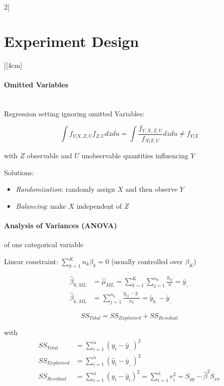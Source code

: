 \documentclass[8pt]{extarticle}
\begin{document}
\begin{multicols}{2}[\section{Experiment Design}][4cm]

\paragraph{Omitted Variables} \ \\

Regression setting ignoring omitted Variables:

$$\int f_{Y|X,Z,U}f_{Z,U}dzdu = \int \frac{f_{Y,X,Z,U}}{f_{X|Z,U}}dzdu \neq f_{Y|X}$$

\noindent with $Z$ observable and $U$ unobservable quantities influencing $Y$

Solutions:
\begin{itemize}
\item \textit{Randomization}: randomly assign $X$ and then observe $Y$
\item \textit{Balancing}: make $X$ independent of $Z$
\end{itemize}


\paragraph{Analysis of Variances (ANOVA)} of one categorical variable

\noindent Linear constraint: $\sum_{k=1}^K n_k \beta_k = 0$ (usually controlled over $\beta_K$)

\begin{align*}
\hat{\beta}_{0, ML} &= \hat{\mu}_{ML} = \sum_{k=1}^K\sum_{j=1}^{n_k} \frac{y_{kj}}{n} = \bar{y}_{..}\\
\hat{\beta}_{k,ML} &= \sum_{j=1}^{n_k} \frac{y_{kj}-\bar{y}_{..}}{n_k} = \bar{y}_{k.} - \bar{y}_{..}
\end{align*}

$$SS_{Total}=SS_{Explained}+SS_{Residual}$$

with
\begin{align*}
SS_{Total}  &=  \sum\limits_{i=1}^n(y_i-\bar{y}_{..})^2 \\
SS_{Explained} &= \sum\limits_{i=1}^n(\hat{y}_i-\bar{y}_{..})^2 \\
SS_{Residual} &= \sum\limits_{i=1}^n(y_i-\hat{y}_i)^2=\sum\limits_{i=1}^n e_i^2=S_{yy}-\hat{\beta}^2S_{xx} 
\end{align*}




\end{multicols}
\end{document}
